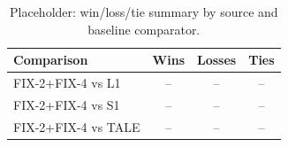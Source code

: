 \begin{table}[t]
\centering
\caption{Placeholder: win/loss/tie summary by source and baseline comparator.}
\label{tab:wlt_placeholder}
\small
\begin{tabular}{lccc}
\toprule
Comparison & Wins & Losses & Ties \\
\midrule
FIX-2+FIX-4 vs L1 & -- & -- & -- \\
FIX-2+FIX-4 vs S1 & -- & -- & -- \\
FIX-2+FIX-4 vs TALE & -- & -- & -- \\
\bottomrule
\end{tabular}
\end{table}
